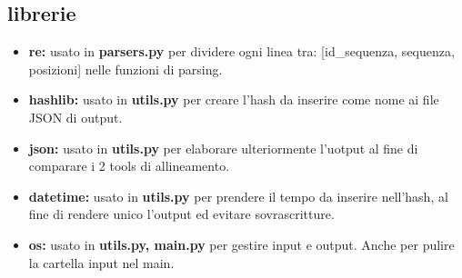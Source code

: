\documentclass[12pt]{article}
\begin{document}
	\subsection{librerie}
		\begin{itemize}
			\item\textbf{re:} usato in \textbf{parsers.py} per dividere ogni linea tra: [id\_sequenza, sequenza, posizioni] nelle funzioni di parsing.
			\item\textbf{hashlib:} usato in \textbf{utils.py} per creare l'hash da inserire come nome ai file JSON di output.
			\item\textbf{json:} usato in \textbf{utils.py} per elaborare ulteriormente l'uotput al fine di comparare i 2 tools di allineamento.
			\item\textbf{datetime:} usato in \textbf{utils.py} per prendere il tempo da inserire nell'hash, al fine di rendere unico l'output ed evitare sovrascritture.
			\item\textbf{os:} usato in \textbf{utils.py, main.py} per gestire input e output. Anche per pulire la cartella input nel main.
		\end{itemize}
\end{document}
